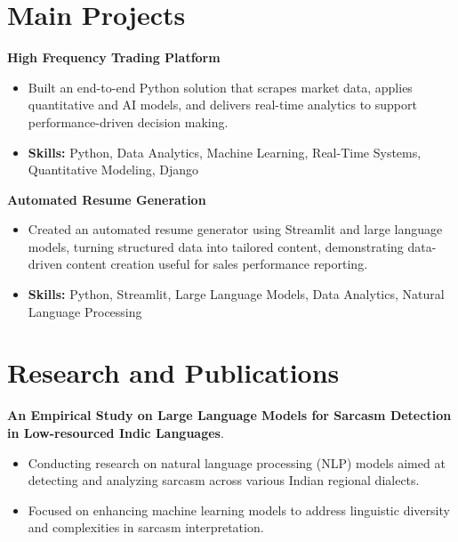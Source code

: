 \documentclass[a4paper,11pt]{article}
\begin{document}
\section{\textbf{Main Projects}}

\vspace{1mm}
  \textbf{High Frequency Trading Platform  }
\vspace{-1.5mm} %
\begin{itemize}
  \item Built an end-to-end Python solution that scrapes market data, applies quantitative and AI models, and delivers real-time analytics to support performance-driven decision making.
\vspace{-3mm}
  \item \textbf{Skills:} Python, Data Analytics, Machine Learning, Real-Time Systems, Quantitative Modeling, Django
\end{itemize}


\vspace{1mm}
   \textbf{Automated Resume Generation }
\vspace{-1.5mm} %
\begin{itemize}
  \item Created an automated resume generator using Streamlit and large language models, turning structured data into tailored content, demonstrating data-driven content creation useful for sales performance reporting.
\vspace{-3mm}
  \item \textbf{Skills:} Python, Streamlit, Large Language Models, Data Analytics, Natural Language Processing
\end{itemize}



\section{\textbf{Research and Publications} \hfill }
\vspace{1mm}
  \textbf{An Empirical Study on Large Language Models for Sarcasm Detection in Low-resourced Indic Languages}.
\vspace{-1mm} %
\begin{itemize}
  \item Conducting research on natural language processing (NLP) models aimed at detecting and analyzing sarcasm across various Indian regional dialects.
\vspace{-3mm}
  \item Focused on enhancing machine learning models to address linguistic diversity and complexities in sarcasm interpretation.
\end{itemize}
\end{document}
